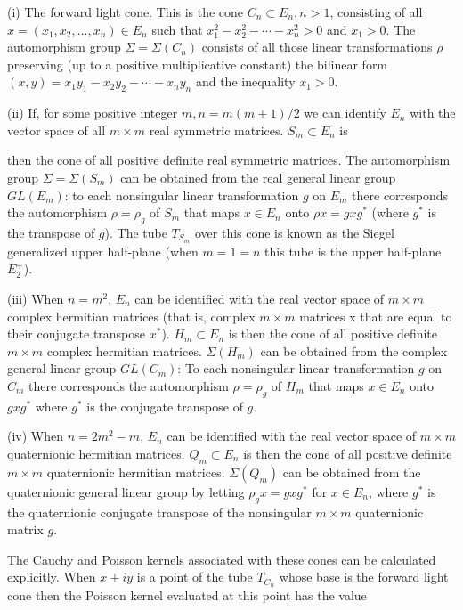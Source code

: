 (i) The forward light cone. This is the cone $C_n \subset E_n, n > 1$, consisting of all $x = (x_1, x_2, \ldots, x_n) \in E_n$ such that $x_1^2 - x_2^2 - \cdots - x_n^2 > 0$ and $x_1 > 0$. The automorphism group $\Sigma = \Sigma(C_n)$ consists of all those linear transformations $\rho$ preserving (up to a positive multiplicative constant) the bilinear form $(x, y) = x_1 y_1 - x_2 y_2 - \cdots - x_n y_n$ and the inequality $x_1 > 0$.

(ii) If, for some positive integer $m, n = m(m + 1)/2$ we can identify $E_n$ with the vector space of all $m \times m$ real symmetric matrices. $S_m \subset E_n$ is

then the cone of all positive definite real symmetric matrices. The automorphism group $\Sigma = \Sigma(S_m)$ can be obtained from the real general linear group $GL(E_m)$: to each nonsingular linear transformation $g$ on $E_m$ there corresponds the automorphism $\rho = \rho_g$ of $S_m$ that maps $x \in E_n$ onto $\rho x = g x g^*$ (where $g^*$ is the transpose of $g$). The tube $T_{S_m}$ over this cone is known as the Siegel generalized upper half-plane (when $m = 1 = n$ this tube is the upper half-plane $E_2^+$).

(iii) When $n = m^2$, $E_n$ can be identified with the real vector space of $m \times m$ complex hermitian matrices (that is, complex $m \times m$ matrices x that are equal to their conjugate transpose $x^*$). $H_m \subset E_n$ is then the cone of all positive definite $m \times m$ complex hermitian matrices. $\Sigma(H_m)$ can be obtained from the complex general linear group $GL(C_m)$: To each nonsingular linear transformation $g$ on $C_m$ there corresponds the automorphism $\rho = \rho_g$ of $H_m$ that maps $x \in E_n$ onto $gxg^*$ where $g^*$ is the conjugate transpose of $g$.

(iv) When $n = 2m^2 - m$, $E_n$ can be identified with the real vector space of $m \times m$ quaternionic hermitian matrices. $Q_m \subset E_n$ is then the cone of all positive definite $m \times m$ quaternionic hermitian matrices. $\Sigma(Q_m)$ can be obtained from the quaternionic general linear group by letting $\rho_g x = g x g^*$ for $x \in E_n$, where $g^*$ is the quaternionic conjugate transpose of the nonsingular $m \times m$ quaternionic matrix $g$.

The Cauchy and Poisson kernels associated with these cones can be calculated explicitly. When $x + iy$ is a point of the tube $T_{C_n}$ whose base is the forward light cone then the Poisson kernel evaluated at this point has the value


